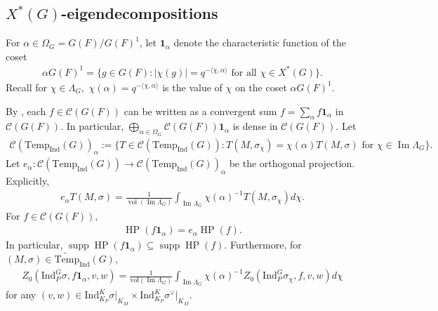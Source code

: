 \documentclass[10pt]{amsart}
\theoremstyle{definition}
\numberwithin{equation}{section}
\DeclareMathOperator{\vol}{\mathrm{vol}}
\DeclareMathOperator{\supp}{\mathrm{supp}}
\numberwithin{equation}{subsection}
\newcommand{\Ind}{\mathrm{Ind}}
\newcommand{\Temp}{\mathrm{Temp}}
\renewcommand{\Im}{\mathop{\mathrm{Im}}}
\newcommand{\HP}{\mathop{\mathrm{HP}}\nolimits}
\begin{document}
\subsection{$X^*(G)$-eigendecompositions} 

For $\alpha\in \Omega_G= G(F)/G(F)^1$, let $\mathbf{1}_\alpha$ denote the characteristic function of the coset
\begin{align*}
     \alpha G(F)^1 = \big\{g\in G(F): |\chi(g)| = q^{-\langle\chi,\alpha\rangle}\text{ for all }\chi\in X^*(G)\big\}.
\end{align*}
Recall for $\chi\in \Lambda_G,$ $\chi(\alpha)=q^{-\langle\chi,\alpha\rangle}$ is the value of $\chi$ on the coset $\alpha G(F)^1$.


By \cite[Lemma 6.8]{DRS}, each $f\in \mathcal{C}(G(F))$ can be written as a convergent sum $f=\sum_\alpha f\mathbf{1}_\alpha$ in $\mathcal{C}(G(F))$. In particular, $\bigoplus\limits_{\alpha\in\Omega_G}\mathcal{C}(G(F))\mathbf{1}_\alpha$ is dense in $\mathcal{C}(G(F))$. Let 
\begin{align*}
    \mathcal{C}(\Temp_\Ind(G))_\alpha:=\{T\in \mathcal{C}(\Temp_\Ind(G)): T(M,\sigma_\chi) = \chi(\alpha) T(M,\sigma) \text{ for }\chi\in \Im\Lambda_G\}.
\end{align*}
Let
$e_\alpha:\mathcal{C}(\Temp_\Ind(G))\to \mathcal{C}(\Temp_\Ind(G))_\alpha$ be the orthogonal projection. Explicitly, 
\begin{align}\label{ealpha:orthproj}
    e_\alpha T(M,\sigma) = \frac{1}{\vol(\Im \Lambda_G)}\int_{\Im \Lambda_G} \chi(\alpha)^{-1}T(M,\sigma_\chi)d\chi.
\end{align}
For $f\in \mathcal{C}(G(F)),$
\begin{align}\label{HP:orthoproj:alpha}
    \HP(f\mathbf{1}_\alpha) = e_\alpha\HP(f).
\end{align}
In particular, $\supp\HP(f\mathbf{1}_\alpha)\subseteq \supp\HP(f)$. Furthermore, for $(M,\sigma)\in\widetilde{\Temp}_\Ind(G)$,
    \begin{align}\label{eq:restricts:coset}
        Z_0(\Ind_P^G\sigma,f\mathbf{1}_\alpha,v,w) = \frac{1}{\mathrm{vol}(\Im \Lambda_G)}\int_{\Im \Lambda_G} \chi(\alpha)^{-1} Z_0(\Ind_P^G \sigma_\chi,f,v,w)d\chi
    \end{align}
for any $(v,w)\in\Ind_{K_P}^K\sigma\vert_{K_M}\times\Ind_{K_P}^K\sigma^\vee\vert_{K_M}.$
\end{document}
